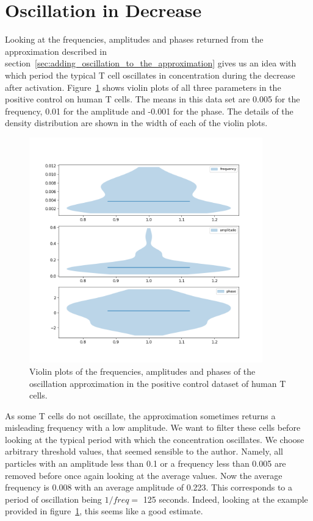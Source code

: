 \section{Oscillation in Decrease}
\label{sec:oscillation_in_decrease}

Looking at the frequencies, amplitudes and phases returned from the approximation described in section~\ref{sec:adding_oscillation_to_the_approximation} gives us an idea with which period the typical T cell oscillates in \Calcium concentration during the decrease after activation. Figure~\ref{fig:freq_amp} shows violin plots of all three parameters in the positive control on human T cells. The means in this data set are 0.005 for the frequency, 0.01 for the amplitude and -0.001 for the phase. The details of the density distribution are shown in the width of each of the violin plots.

\begin{figure}[h!]
	\centering
	\includegraphics[width=0.9\textwidth]{fig/freq_amp}
	
	\caption{Violin plots of the frequencies, amplitudes and phases of the oscillation approximation in the positive control dataset of human T cells.}
	\label{fig:freq_amp}
\end{figure}

As some T cells do not oscillate, the approximation sometimes returns a misleading frequency with a low amplitude. We want to filter these cells before looking at the typical period with which the \Calcium concentration oscillates. We choose arbitrary threshold values, that seemed sensible to the author. Namely, all particles with an amplitude less than 0.1 or a frequency less than 0.005 are removed before once again looking at the average values. Now the average frequency is 0.008 with an average amplitude of 0.223. This corresponds to a period of oscillation being $1/freq = $ 125 seconds. Indeed, looking at the example provided in figure~\ref{fig:freq_amp}, this seems like a good estimate.

